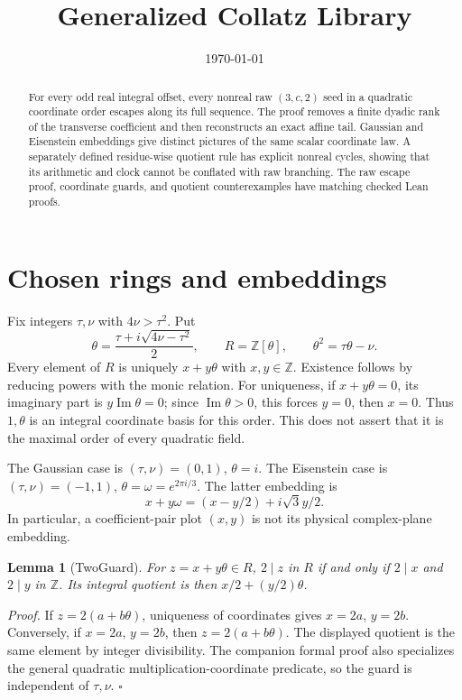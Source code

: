 \documentclass[11pt,letterpaper]{article}
\title{Generalized Collatz Library}
\author{}
\date{\today}
\newcommand{\Z}{\mathbb{Z}}
\newtheorem{lemma}[theorem]{Lemma}
\newenvironment{proof}{\noindent\textit{Proof.}}{\hfill\(\square\)}
\begin{document}
\maketitle

\begin{abstract}
For every odd real integral offset, every nonreal raw \((3,c,2)\) seed in a quadratic coordinate order escapes along its full sequence. The proof removes a finite dyadic rank of the transverse coefficient and then reconstructs an exact affine tail. Gaussian and Eisenstein embeddings give distinct pictures of the same scalar coordinate law. A separately defined residue-wise quotient rule has explicit nonreal cycles, showing that its arithmetic and clock cannot be conflated with raw branching. The raw escape proof, coordinate guards, and quotient counterexamples have matching checked Lean proofs.
\end{abstract}

\section{Chosen rings and embeddings}

Fix integers \(\tau,\nu\) with \(4\nu>\tau^2\). Put
\[
\theta=\frac{\tau+i\sqrt{4\nu-\tau^2}}2,
\qquad R=\Z[\theta],\qquad \theta^2=\tau\theta-\nu.
\]
Every element of \(R\) is uniquely \(x+y\theta\) with \(x,y\in\Z\). Existence follows by reducing powers with the monic relation. For uniqueness, if \(x+y\theta=0\), its imaginary part is \(y\operatorname{Im}\theta=0\); since \(\operatorname{Im}\theta>0\), this forces \(y=0\), then \(x=0\). Thus \(1,\theta\) is an integral coordinate basis for this order. This does not assert that it is the maximal order of every quadratic field.

The Gaussian case is \((\tau,\nu)=(0,1)\), \(\theta=i\). The Eisenstein case is \((\tau,\nu)=(-1,1)\), \(\theta=\omega=e^{2\pi i/3}\). The latter embedding is
\[
x+y\omega=(x-y/2)+i\sqrt3y/2.
\]
In particular, a coefficient-pair plot \((x,y)\) is not its physical complex-plane embedding.

\begin{lemma}[TwoGuard]
For \(z=x+y\theta\in R\), \(2\mid z\) in \(R\) if and only if \(2\mid x\) and \(2\mid y\) in \(\Z\). Its integral quotient is then \(x/2+(y/2)\theta\).
\end{lemma}
\begin{proof}
If \(z=2(a+b\theta)\), uniqueness of coordinates gives \(x=2a\), \(y=2b\). Conversely, if \(x=2a\), \(y=2b\), then \(z=2(a+b\theta)\). The displayed quotient is the same element by integer divisibility. The companion formal proof also specializes the general quadratic multiplication-coordinate predicate, so the guard is independent of \(\tau,\nu\).
\end{proof}
\end{document}
